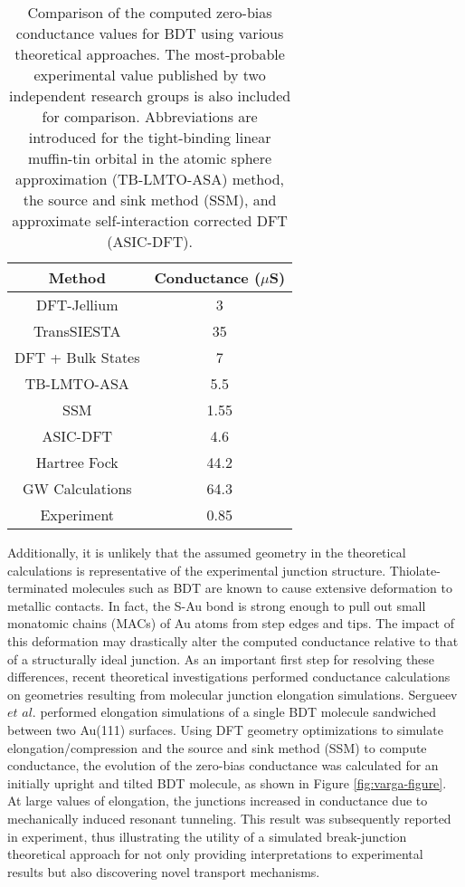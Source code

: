 \documentclass[10pt]{report}  %
\newcommand{\T}{\rule{0pt}{2.6ex}}
\newcommand{\B}{\rule[-1.2ex]{0pt}{0pt}}
\begin{document}
\begin{table} [t!]
\caption{Comparison of the computed zero-bias conductance values for BDT using various theoretical approaches. The most-probable experimental value published by two independent research groups is also included for comparison. Abbreviations are introduced for the tight-binding linear muffin-tin orbital in the atomic sphere approximation (TB-LMTO-ASA) method, the source and sink method (SSM), and approximate self-interaction corrected DFT (ASIC-DFT).}
\centering
\begin{tabular}{ c  c  }
	\hline \hline
Method\T \B & Conductance ($\mu$S) \\
	\hline
DFT-Jellium \cite{DiVentra:2000} \T \B & 3 \\
TransSIESTA \cite{Stokbro:2003} \T \B & 35 \\
DFT + Bulk States \cite{Tomfohr:2004} \T \B & 7 \\
TB-LMTO-ASA \cite{Faleev:2005} \T \B & 5.5 \\
SSM \cite{Varga:2007} \T \B & 1.55 \\
ASIC-DFT \cite{Toher:2007,Toher:2008} \T \B & 4.6 \\
Hartree Fock \cite{Strange:2011} \T \B & 44.2 \\
GW Calculations \cite{Strange:2011} \T \B & 64.3 \\
	\hline
Experiment \cite{Xiao:2004,Tsutsui:2009} \T \B & 0.85 \\
	\hline
        \hline
\end{tabular}
\label{table:conductance}
\end{table} 

Additionally, it is unlikely that the assumed geometry in the theoretical calculations is representative of the experimental junction structure. Thiolate-terminated molecules such as BDT are known to cause extensive deformation to metallic contacts. \cite{Huang:2007,Frei:2012} In fact, the S-Au bond is strong enough to pull out small monatomic chains (MACs) of Au atoms from step edges \cite{Kruger:2002} and tips. \cite{Paulsson:2009} The impact of this deformation may drastically alter the computed conductance relative to that of a structurally ideal junction. As an important first step for resolving these differences, recent theoretical investigations \cite{Paulsson:2009,Strange:2010,Sergueev:2010,Pontes:2011} performed conductance calculations on geometries resulting from molecular junction elongation simulations. Sergueev $et$ $al.$ \cite{Sergueev:2010} performed elongation simulations of a single BDT molecule sandwiched between two Au(111) surfaces. Using DFT geometry optimizations to simulate elongation/compression and the source and sink method (SSM) \cite{Varga:2007} to compute conductance, the evolution of the zero-bias conductance was calculated for an initially upright and tilted BDT molecule, as shown in Figure \ref{fig:varga-figure}. At large values of elongation, the junctions increased in conductance due to mechanically induced resonant tunneling. This result was subsequently reported in experiment,\cite{Bruot:2012} thus illustrating the utility of a simulated break-junction theoretical approach for not only providing interpretations to experimental results but also discovering novel transport mechanisms.
\end{document}
